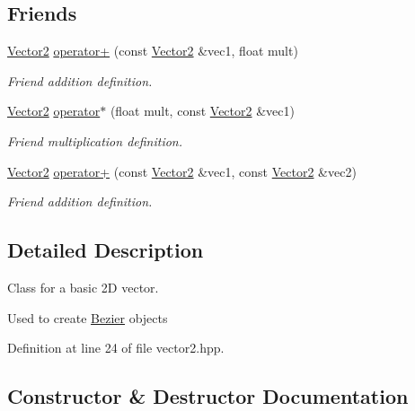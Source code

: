 \subsection*{Friends}
\begin{DoxyCompactItemize}
\item 
\mbox{\hyperlink{classVector2}{Vector2}} \mbox{\hyperlink{classVector2_a1ce2215611e761b7b1ca2f9f0dcdeb12}{operator+}} (const \mbox{\hyperlink{classVector2}{Vector2}} \&vec1, float mult)
\begin{DoxyCompactList}\small\item\em Friend addition definition. \end{DoxyCompactList}\item 
\mbox{\hyperlink{classVector2}{Vector2}} \mbox{\hyperlink{classVector2_abed1d1283eebca3cc8248543d219a937}{operator$\ast$}} (float mult, const \mbox{\hyperlink{classVector2}{Vector2}} \&vec1)
\begin{DoxyCompactList}\small\item\em Friend multiplication definition. \end{DoxyCompactList}\item 
\mbox{\hyperlink{classVector2}{Vector2}} \mbox{\hyperlink{classVector2_aec551a9b18e5851febf60c555fc382ab}{operator+}} (const \mbox{\hyperlink{classVector2}{Vector2}} \&vec1, const \mbox{\hyperlink{classVector2}{Vector2}} \&vec2)
\begin{DoxyCompactList}\small\item\em Friend addition definition. \end{DoxyCompactList}\end{DoxyCompactItemize}


\subsection{Detailed Description}
Class for a basic 2D vector. 

Used to create \mbox{\hyperlink{classBezier}{Bezier}} objects 

Definition at line 24 of file vector2.\+hpp.



\subsection{Constructor \& Destructor Documentation}
\mbox{\label{classVector2_a061ab58a0e216c759d64e3746d712b12}} 
